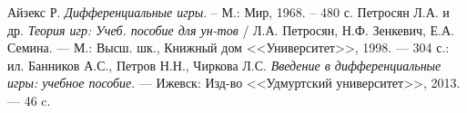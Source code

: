\documentclass{extreport}
\begin{document}
    
    \begin{thebibliography}{3}
         Айзекс Р. \emph{Дифференциальные игры}. -- М.: Мир, 1968. -- 480 с.
         Петросян Л.А. и др. \emph{Теория игр: Учеб. пособие для ун-тов }/ Л.А. Петросян, Н.Ф. Зенкевич, Е.А. Семина. --- М.: Высш. шк.,
        Книжный дом <<Университет>>, 1998. --- 304 с.: ил.
         Банников А.С., Петров Н.Н., Чиркова Л.С. \emph{Введение в дифференциальные игры: учебное пособие}. --- Ижевск: Изд-во 
        <<Удмуртский университет>>, 2013. --- 46 c.
    \end{thebibliography}
\end{document}
